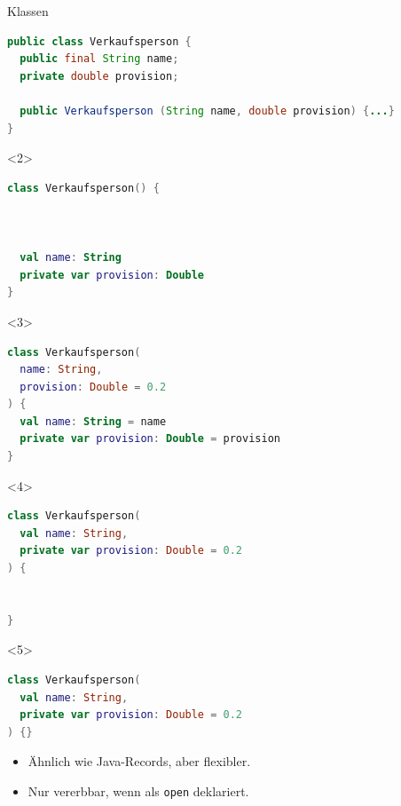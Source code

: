 \documentclass{beamer}
\begin{document}
\begin{frame}[fragile]{Klassen}
  \vspace{-0.25cm}
  \begin{lstlisting}[language=Java, title=Java, xleftmargin=1em]
public class Verkaufsperson {
  public final String name;
  private double provision;

  public Verkaufsperson (String name, double provision) {...}
}
  \end{lstlisting}
  \vspace{-0.25cm}
  \begin{onlyenv}<2>
    \begin{lstlisting}[language=Kotlin, title=Kotlin, xleftmargin=1em]
class Verkaufsperson() {



  val name: String
  private var provision: Double
}
    \end{lstlisting} 
  \end{onlyenv}
  \begin{onlyenv}<3>
    \begin{lstlisting}[language=Kotlin, title=Kotlin, xleftmargin=1em]
class Verkaufsperson(
  name: String,
  provision: Double = 0.2
) {
  val name: String = name
  private var provision: Double = provision
}
    \end{lstlisting} 
  \end{onlyenv}
  \begin{onlyenv}<4>
    \begin{lstlisting}[language=Kotlin, title=Kotlin, xleftmargin=1em]
class Verkaufsperson(
  val name: String,
  private var provision: Double = 0.2
) {


}
    \end{lstlisting} 
  \end{onlyenv}
  \begin{onlyenv}<5>
    \begin{lstlisting}[language=Kotlin, title=Kotlin, xleftmargin=1em]
class Verkaufsperson(
  val name: String,
  private var provision: Double = 0.2
) {}
    \end{lstlisting} 
    \begin{itemize}
      \item Ähnlich wie Java-Records, aber flexibler.
      \item Nur vererbbar, wenn als \texttt{open} deklariert.
    \end{itemize}
  \end{onlyenv}
\end{frame}
\end{document}
